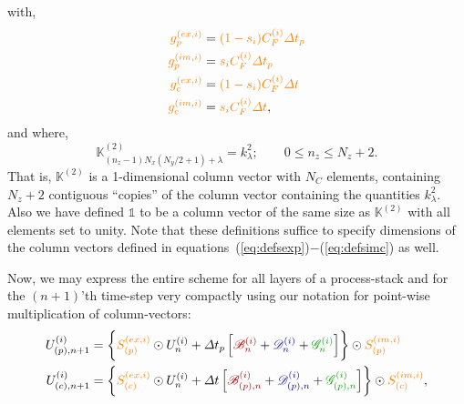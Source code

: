\documentclass[12pt]{memoir}
\newcommand{\bfield}{\mathscr{B}}
\newcommand{\dfield}{\mathscr{D}}
\newcommand{\gfield}{\mathscr{G}}
\newcommand{\kcolvec}{\mathbb{K}^{(2)}}
\begin{document}
%
with,
%
\begin{subequations}
\begin{align}
  {\color{orange}g^{(ex,i)}_{p}} &= {\color{orange}(1-s_i)C^{(i)}_F \Delta t_p} \label{eq:defgexp} \\
  {\color{orange}g^{(im,i)}_{p}} &= {\color{orange}   s_i C^{(i)}_F \Delta t_p} \label{eq:defgimp} \\
  {\color{orange}g^{(ex,i)}_{c}} &= {\color{orange}(1-s_i)C^{(i)}_F \Delta t  } \label{eq:defexc}  \\
  {\color{orange}g^{(im,i)}_{c}} &= {\color{orange}   s_i C^{(i)}_F \Delta t  },\label{eq:defimc}
\end{align}
\end{subequations}
%
and where,
%
\begin{equation}
  \kcolvec_{(n_z - 1)N_x(N_y/2+1) + \lambda} = k^2_\lambda;\qquad 0\le n_z \le N_z+2.
  \label{eq:defkcol}
\end{equation}
%
That is, $\kcolvec$ is a 1-dimensional column vector with $N_C$
elements, containing $N_z+2$ contiguous ``copies'' of the column
vector containing the quantities $k^2_\lambda$. Also we have defined
$\mathbb{1}$ to be a column vector of the same size as $\kcolvec$
with all elements set to unity. Note that these definitions suffice 
to specify dimensions of the column vectors defined in
equations~(\ref{eq:defsexp})$-$(\ref{eq:defsimc}) as well.
%
\par
%
Now, we may express the entire scheme for all layers of a 
process-stack and for the $(n+1)$'th time-step very compactly
using our notation for point-wise multiplication of column-vectors:
%
\begin{subequations}
\begin{align}
  U^{(i)}_{(p),n+1} &= 
  \biggl\{ 
%
            {\color{orange}S^{(ex,i)}_{(p)} } 
            \odot 
            U^{(i)}_n
%
  + \Delta t_p
    \left[
              { \color{red!65!black}   \bfield^{(i)}_n}
            + { \color{blue!65!black}  \dfield^{(i)}_n}
            + { \color{green!65!black} \gfield^{(i)}_n}
    \right]
 \biggr\} \odot 
%
{\color{orange} S^{(im,i)}_{(p)} }
%
 \label{eq:cipred}  \\
%
  U^{(i)}_{(c),n+1} &= 
   \biggl\{ 
%
 {\color{orange}S^{(ex,i)}_{(c)} }
             \odot 
             U^{(i)}_n
%
  + \Delta t 
    \left[
              {\color{red!65!black}  \bfield^{(i)}_{(p),n} }
            + {\color{blue!65!black} \dfield^{(i)}_{(p),n} }
            + {\color{green!65!black}\gfield^{(i)}_{(p),n} }
    \right]
  \biggr\} \odot 
  {\color{orange}S^{(im,i)}_{(c)} }
  \label{eq:cicorr},
\end{align}
\end{subequations}
\end{document}
